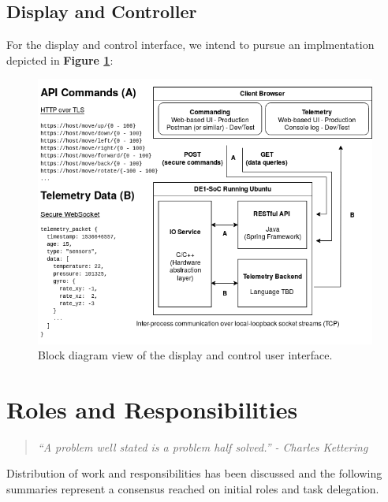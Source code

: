 \documentclass{article}
\begin{document}

\pagebreak

\subsection{Display and Controller}

For the display and control interface, we intend to pursue an
implmentation depicted in \textbf{Figure \ref{fig:display_controller}}:

\begin{figure}[H]
	\centering
	\includegraphics[width=\linewidth]{../src/im/display_controller}
	\caption{Block diagram view of the display and control user
		interface.}
	\label{fig:display_controller}
\end{figure}


\section{Roles and Responsibilities}

\begin{quote}
	\textit{``A problem well stated is a problem half
	solved.'' - Charles Kettering}
\end{quote}

\noindent Distribution of work and responsibilities has been discussed and the
following summaries represent a consensus reached on initial roles and task
delegation.
\end{document}
